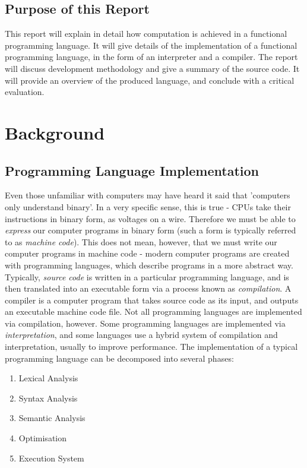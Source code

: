 \documentclass{article}
\begin{document}
\subsection{Purpose of this Report}
This report will explain in detail how computation is achieved in a functional programming language. It will give details of the implementation of a functional programming language, in the form of an interpreter and a compiler. The report will discuss development methodology and give a summary of the source code. It will provide an overview of the produced language, and conclude with a critical evaluation.

\pagebreak
\section{Background}

\subsection{Programming Language Implementation}
Even those unfamiliar with computers may have heard it said that 'computers only understand binary'. In a very specific sense, this is true - CPUs take their instructions in binary form, as voltages on a wire. Therefore we must be able to \emph{express} our computer programs in binary form (such a form is typically referred to as \emph{machine code}). This does not mean, however, that we must write our computer programs in machine code - modern computer programs are created with programming languages, which describe programs in a more abstract way. Typically, \emph{source code} is written in a particular programming language, and is then translated into an executable form via a process known as \emph{compilation}. A compiler is a computer program that takes source code as its input, and outputs an executable machine code file. Not all programming languages are implemented via compilation, however. Some programming languages are implemented via \emph{interpretation}, and some languages use a hybrid system of compilation and interpretation, usually to improve performance. The implementation of a typical programming language can be decomposed into several phases: 
\begin{enumerate}
    \item Lexical Analysis
    \item Syntax Analysis
    \item Semantic Analysis
    \item Optimisation
    \item Execution System
\end{enumerate}
\end{document}
